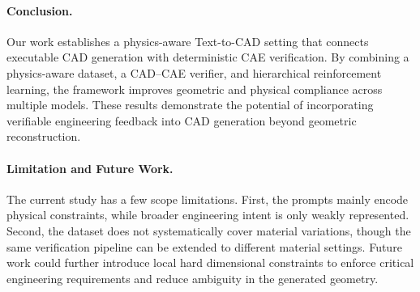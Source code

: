 \paragraph{Conclusion.} Our work establishes a physics-aware Text-to-CAD setting that connects executable CAD generation with deterministic CAE verification. By combining a physics-aware dataset, a CAD--CAE verifier, and hierarchical reinforcement learning, the framework improves geometric and physical compliance across multiple models. These results demonstrate the potential of incorporating verifiable engineering feedback into CAD generation beyond geometric reconstruction.


\paragraph{Limitation and Future Work.} The current study has a few scope limitations. First, the prompts mainly encode physical constraints, while broader engineering intent is only weakly represented. Second, the dataset does not systematically cover material variations, though the same verification pipeline can be extended to different material settings. Future work could further introduce local hard dimensional constraints to enforce critical engineering requirements and reduce ambiguity in the generated geometry.
